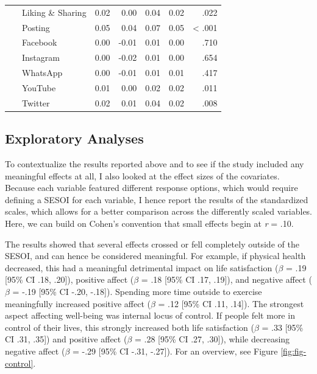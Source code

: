 \documentclass[
  man,mask,floatsintext]{apa7}
\begin{document}
\begin{table}[tbp]
\begin{center}
\begin{threeparttable}
{\begin{tabular}{lrrrrr}
\ \ \ Liking \& Sharing & 0.02 & 0.00 & 0.04 & 0.02 & .022\\
\ \ \ Posting & 0.05 & 0.04 & 0.07 & 0.05 & < .001\\
\ \ \ Facebook & 0.00 & -0.01 & 0.01 & 0.00 & .710\\
\ \ \ Instagram & 0.00 & -0.02 & 0.01 & 0.00 & .654\\
\ \ \ WhatsApp & 0.00 & -0.01 & 0.01 & 0.01 & .417\\
\ \ \ YouTube & 0.01 & 0.00 & 0.02 & 0.02 & .011\\
\ \ \ Twitter & 0.02 & 0.01 & 0.04 & 0.02 & .008\\
\bottomrule
\end{tabular}

}

\end{threeparttable}
\end{center}

\end{table}

\hypertarget{exploratory-analyses}{%
\subsection{Exploratory Analyses}\label{exploratory-analyses}}

To contextualize the results reported above and to see if the study included any meaningful effects at all, I also looked at the effect sizes of the covariates.
Because each variable featured different response options, which would require defining a SESOI for each variable, I hence report the results of the standardized scales, which allows for a better comparison across the differently scaled variables.
Here, we can build on Cohen's convention that small effects begin at \emph{r} = \textbar.10\textbar.

The results showed that several effects crossed or fell completely outside of the SESOI, and can hence be considered meaningful.
For example, if physical health decreased, this had a meaningful detrimental impact on life satisfaction (\(\beta\) = .19 {[}95\% CI .18, .20{]}), positive affect (\(\beta\) = .18 {[}95\% CI .17, .19{]}), and negative affect (\(\beta\) = -.19 {[}95\% CI -.20, -.18{]}).
Spending more time outside to exercise meaningfully increased positive affect (\(\beta\) = .12 {[}95\% CI .11, .14{]}).
The strongest aspect affecting well-being was internal locus of control.
If people felt more in control of their lives, this strongly increased both life satisfaction (\(\beta\) = .33 {[}95\% CI .31, .35{]}) and
positive affect (\(\beta\) = .28 {[}95\% CI .27, .30{]}),
while decreasing negative affect (\(\beta\) = -.29 {[}95\% CI -.31, -.27{]}).
For an overview, see Figure \ref{fig:fig-control}.
\end{document}
